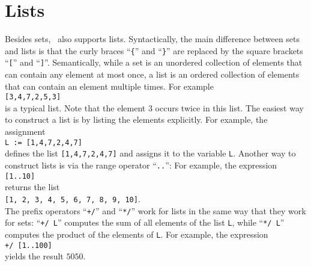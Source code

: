 \section{Lists}
Besides sets, \setlx\ also supports lists.  Syntactically, the main difference between sets and
lists is that the
curly braces ``\texttt{\{}'' and ``\texttt{\}}'' are replaced by the square brackets
``\texttt{[}'' and ``\texttt{]}''.  Semantically, while a set is an unordered collection of elements
that can contain any element at most once, a list is an ordered collection of elements that 
can contain an element multiple times.  For example
\\[0.2cm]
\hspace*{1.3cm}
\texttt{[3,4,7,2,5,3]}
\\[0.2cm]
is a typical list.  Note that the element $3$ occurs twice in this list.  The easiest way to
construct a list is by listing the elements explicitly. For 
example, the assignment
\\[0.2cm]
\hspace*{1.3cm}
\texttt{L := [1,4,7,2,4,7]}
\\[0.2cm]
defines the list \texttt{[1,4,7,2,4,7]} and assigns it to the variable \texttt{L}.
Another way to construct lists is via the range operator ``\texttt{..}'':
For example, the expression
\\[0.2cm]
\hspace*{1.3cm}
\texttt{[1..10]}
\\[0.2cm]
returns the list
\\[0.2cm]
\hspace*{1.3cm}
\texttt{[1, 2, 3, 4, 5, 6, 7, 8, 9, 10]}.
\\[0.2cm]
The prefix operators ``\texttt{+/}'' and ``\texttt{*/}'' work for lists in the same way that they
work for sets: ``\texttt{+/ L}'' computes the sum of all elements of the list \texttt{L}, while
``\texttt{*/ L}'' computes the product of the elements of \texttt{L}.  For example, the expression
\\[0.2cm]
\hspace*{1.3cm}
\texttt{+/ [1..100]}
\\[0.2cm]
yields the result $5050$.


